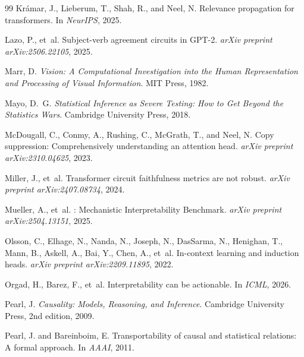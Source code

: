 \documentclass[10pt]{article}
\begin{document}
\begin{thebibliography}{99}
Kr{\'a}mar, J., Lieberum, T., Shah, R., and Neel, N.
\newblock Relevance propagation for transformers.
\newblock In \emph{NeurIPS}, 2025.

Lazo, P., et~al.
\newblock Subject-verb agreement circuits in {GPT}-2.
\newblock \emph{arXiv preprint arXiv:2506.22105}, 2025.

Marr, D.
\newblock \emph{Vision: A Computational Investigation into the Human Representation and Processing of Visual Information}.
\newblock MIT Press, 1982.

Mayo, D.~G.
\newblock \emph{Statistical Inference as Severe Testing: How to Get Beyond the Statistics Wars}.
\newblock Cambridge University Press, 2018.

McDougall, C., Conmy, A., Rushing, C., McGrath, T., and Neel, N.
\newblock Copy suppression: Comprehensively understanding an attention head.
\newblock \emph{arXiv preprint arXiv:2310.04625}, 2023.

Miller, J., et~al.
\newblock Transformer circuit faithfulness metrics are not robust.
\newblock \emph{arXiv preprint arXiv:2407.08734}, 2024.

Mueller, A., et~al.
: Mechanistic Interpretability Benchmark.
\newblock \emph{arXiv preprint arXiv:2504.13151}, 2025.

Olsson, C., Elhage, N., Nanda, N., Joseph, N., DasSarma, N., Henighan, T., Mann, B., Askell, A., Bai, Y., Chen, A., et~al.
\newblock In-context learning and induction heads.
\newblock \emph{arXiv preprint arXiv:2209.11895}, 2022.

Orgad, H., Barez, F., et~al.
\newblock Interpretability can be actionable.
\newblock In \emph{ICML}, 2026.

Pearl, J.
\newblock \emph{Causality: Models, Reasoning, and Inference}.
\newblock Cambridge University Press, 2nd edition, 2009.

Pearl, J. and Bareinboim, E.
\newblock Transportability of causal and statistical relations: A formal approach.
\newblock In \emph{AAAI}, 2011.


\end{thebibliography}
\end{document}
